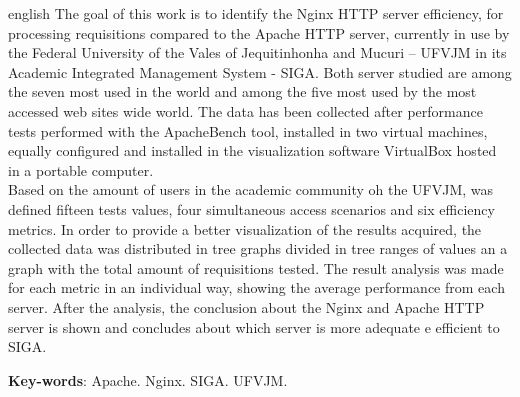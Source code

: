 \begin{resumo}[Abstract]
 \begin{otherlanguage*}{english}
The goal of this work is to identify the Nginx HTTP server efficiency, for 
processing requisitions compared to the Apache HTTP server, currently in use by 
the Federal University of the Vales of Jequitinhonha and Mucuri – UFVJM in its 
Academic Integrated Management System - SIGA. Both server studied are among the 
seven most used in the world and among the five most used by the most accessed 
web sites wide world. The data has been collected after performance tests 
performed with the ApacheBench tool, installed in two virtual machines, equally 
configured and installed in the visualization software VirtualBox hosted in a 
portable computer.\\
Based on the amount of users in the academic community oh the UFVJM, was 
defined fifteen tests values, four simultaneous access scenarios and six 
efficiency metrics. In order to provide a better visualization of the results 
acquired, the collected data was distributed in tree graphs divided in tree 
ranges of values an a graph with the total amount of requisitions tested. The 
result analysis was made for each metric in an individual way, showing the 
average performance from each server. After the analysis, the conclusion about 
the Nginx and Apache HTTP server is shown and concludes about which server is 
more adequate e efficient to SIGA.
   \vspace{\onelineskip}
 
   \noindent 
   \textbf{Key-words}: Apache. Nginx. SIGA. UFVJM.
 \end{otherlanguage*}
\end{resumo}